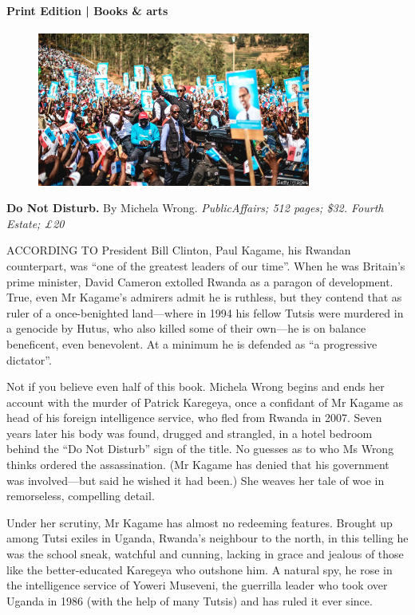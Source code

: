 \documentclass{article}
\begin{document}
\paragraph{Print Edition | Books \& arts  \quad \color{gray}{Mar 25th 2021 }}
\begin{figure}[h]
\centering
\includegraphics[width=0.8\textwidth]{images/20210327_BKP004_0.jpg}
\end{figure}
\textbf{Do Not Disturb.} By Michela Wrong. \emph{PublicAffairs; 512 pages; \$32. Fourth Estate; £20\\ } 

\lettrine{A}CCORDING TO President Bill Clinton, Paul Kagame, his Rwandan counterpart, was ``one of the greatest leaders of our time''. When he was Britain's prime minister, David Cameron extolled Rwanda as a paragon of development. True, even Mr Kagame's admirers admit he is ruthless, but they contend that as ruler of a once-benighted land---where in 1994 his fellow Tutsis were murdered in a genocide by Hutus, who also killed some of their own---he is on balance beneficent, even benevolent. At a minimum he is defended as ``a progressive dictator''. 

Not if you believe even half of this book. Michela Wrong begins and ends her account with the murder of Patrick Karegeya, once a confidant of Mr Kagame as head of his foreign intelligence service, who fled from Rwanda in 2007. Seven years later his body was found, drugged and strangled, in a hotel bedroom behind the ``Do Not Disturb'' sign of the title. No guesses as to who Ms Wrong thinks ordered the assassination. (Mr Kagame has denied that his government was involved---but said he wished it had been.) She weaves her tale of woe in remorseless, compelling detail. 

Under her scrutiny, Mr Kagame has almost no redeeming features. Brought up among Tutsi exiles in Uganda, Rwanda's neighbour to the north, in this telling he was the school sneak, watchful and cunning, lacking in grace and jealous of those like the better-educated Karegeya who outshone him. A natural spy, he rose in the intelligence service of Yoweri Museveni, the guerrilla leader who took over Uganda in 1986 (with the help of many Tutsis) and has ruled it ever since. 
\end{document}
